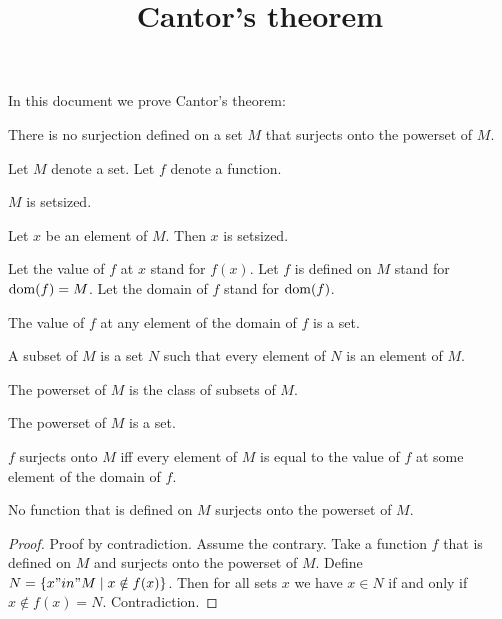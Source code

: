 \documentclass{article}
\title{Cantor's theorem}
\author{}
\date{}
\begin{document}

  \maketitle

  In this document we prove Cantor's theorem:

  \begin{quotedtheorem}
    There is no surjection defined on a set $M$ that surjects onto the powerset of $M$.
  \end{quotedtheorem}

  \begin{forthel}

    Let $M$ denote a set. Let $f$ denote a function.

    \begin{axiom}
        $M$ is setsized.
    \end{axiom}

    \begin{axiom}
        Let $x$ be an element of $M$. Then $x$ is setsized.
    \end{axiom}

    Let the value of $f$ at $x$ stand for $f(x)$.
    Let $f$ is defined on $M$ stand for $\operatorname{dom}(f) = M$.
    Let the domain of $f$ stand for $\operatorname{dom}(f)$.


    \begin{axiom}
      The value of $f$ at any element of the domain of $f$ is a set.
    \end{axiom}

    \begin{definition}[Subset]
      A subset of $M$ is a set $N$ such that every element of $N$ is an element of $M$.
    \end{definition}

    \begin{definition}
      The powerset of $M$ is the class of subsets of $M$.
    \end{definition}

    \begin{axiom}
      The powerset of $M$ is a set.
    \end{axiom}

    \begin{definition}
      $f$ surjects onto $M$ iff every element of $M$ is equal to the value of $f$ at some element of the domain of $f$.
    \end{definition}

    \begin{theorem}[Cantor]
      No function that is defined on $M$ surjects onto the powerset of $M$.
    \end{theorem}
    \begin{proof}
      Proof by contradiction. Assume the contrary.
      Take a function $f$ that is defined on $M$ and surjects onto the powerset of $M$.
      Define $N = \{ x "in" M \mid x \notin f(x) \}$.
      Then for all sets $x$ we have $x\in N$ if and only if $x\notin f(x) = N$.
      Contradiction.
    \end{proof}

  \end{forthel}
\end{document}
